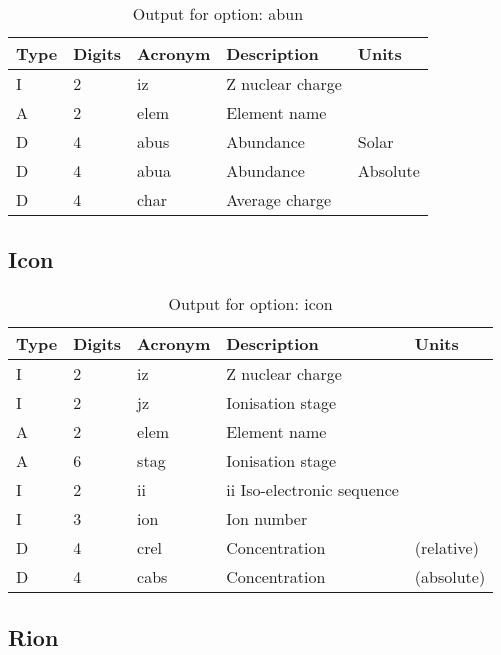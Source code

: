 \begin{table}[!p]
\caption{Output for option: abun}
\label{tabout:abun}
\begin{tabular}{lllll}
\hline
Type & Digits & Acronym & Description & Units \\ 
\hline
I &  2 & iz   & Z nuclear charge                 &                  \\
A &  2 & elem & Element name                     &                  \\
D &  4 & abus & Abundance                        & Solar            \\
D &  4 & abua & Abundance                        & Absolute         \\
D &  4 & char & Average charge                   &                  \\
\hline
\end{tabular}
\end{table}

\subsection{Icon}

\begin{table}[!p]
\caption{Output for option: icon}
\label{tabout:icon}
\begin{tabular}{lllll}
\hline
Type & Digits & Acronym & Description & Units \\ 
\hline
I &  2 & iz   & Z nuclear charge                 &                  \\
I &  2 & jz   & Ionisation stage                 &                  \\
A &  2 & elem & Element name                     &                  \\
A &  6 & stag & Ionisation stage                 &                  \\
I &  2 & ii   & ii Iso-electronic sequence       &                  \\
I &  3 & ion  & Ion number                       &                  \\
D &  4 & crel & Concentration                    & (relative)       \\
D &  4 & cabs & Concentration                    & (absolute)       \\
\hline
\end{tabular}
\end{table}

\subsection{Rion}

